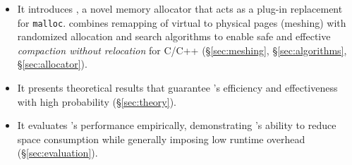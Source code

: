 \begin{itemize}

\item It introduces \textbf{\Mesh}, a novel memory allocator that acts
  as a plug-in replacement for \texttt{malloc}. \Mesh{} combines
  remapping of virtual to physical pages (meshing) with randomized
  allocation and search algorithms to enable safe and effective
  \emph{compaction without relocation} for C/C++
  (\S\ref{sec:meshing}, \S\ref{sec:algorithms},
  \S\ref{sec:allocator}).

\item It presents theoretical results that guarantee \Mesh{}'s
    efficiency and effectiveness with high probability (\S\ref{sec:theory}).

\item It evaluates \Mesh{}'s performance empirically, demonstrating \Mesh{}'s ability to reduce
    space consumption while generally imposing low runtime
    overhead (\S\ref{sec:evaluation}).

\end{itemize}
